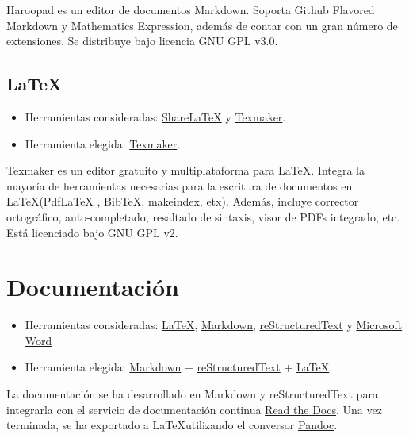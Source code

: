 Haroopad es un editor de documentos Markdown. Soporta Github Flavored
Markdown y Mathematics Expression, además de contar con un gran número
de extensiones. Se distribuye bajo licencia GNU GPL v3.0.

\subsection{LaTeX}\label{latex}

\begin{itemize}
\tightlist
\item
  Herramientas consideradas:
  \href{https://www.sharelatex.com/}{ShareLaTeX} y
  \href{http://www.xm1math.net/texmaker/}{Texmaker}.
\item
  Herramienta elegida:
  \href{http://www.xm1math.net/texmaker/}{Texmaker}.
\end{itemize}

Texmaker es un editor gratuito y multiplataforma para \LaTeX. Integra la
mayoría de herramientas necesarias para la escritura de documentos en
\LaTeX (PdfLaTeX , BibTeX, makeindex, etx). Además, incluye corrector
ortográfico, auto-completado, resaltado de sintaxis, visor de PDFs
integrado, etc. Está licenciado bajo GNU GPL v2.

\section{Documentación}\label{documentacion}

\begin{itemize}
\tightlist
\item
  Herramientas consideradas:
  \href{https://www.latex-project.org/}{LaTeX},
  \href{http://daringfireball.net/projects/markdown/}{Markdown},
  \href{http://docutils.sourceforge.net/docs/ref/rst/restructuredtext.html}{reStructuredText} y  
  \href{https://products.office.com/es-es/word}{Microsoft Word}
\item
  Herramienta elegida:
  \href{http://daringfireball.net/projects/markdown/}{Markdown} +
  \href{http://docutils.sourceforge.net/docs/ref/rst/restructuredtext.html}{reStructuredText} +
  \href{https://www.latex-project.org/}{\LaTeX}.
\end{itemize}

La documentación se ha desarrollado en Markdown y reStructuredText para integrarla con el
servicio de documentación continua \href{https://readthedocs.org/}{Read
the Docs}. Una vez terminada, se ha exportado a \LaTeX utilizando el
conversor \href{http://pandoc.org/}{Pandoc}.


